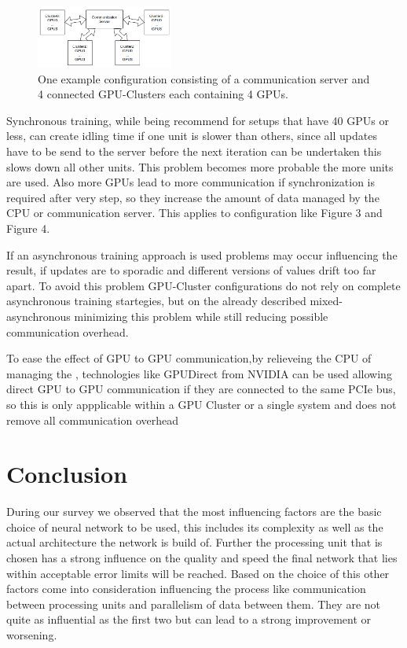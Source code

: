 \documentclass[conference]{IEEEtran}
\begin{document}
\begin{figure}
\centering
\includegraphics[width=0.4\textwidth]{cluster_setup.png}
\caption{One example configuration consisting of a communication server and 4 connected GPU-Clusters each containing 4 GPUs.}
\end{figure}
Synchronous training, while being recommend for setups that have 40 GPUs or less, can create idling time if one unit is slower than others, since all updates have to be send to the server before the next iteration can be undertaken this slows down all other units. This problem becomes more probable the more units are used. Also more GPUs lead to more communication if synchronization is required after very step, so they increase the amount of data managed by the CPU or communication server. This applies to configuration like Figure 3 and Figure 4.

If an asynchronous training approach is used problems may occur influencing the result, if updates are to sporadic and different versions of values drift too far apart. To avoid this problem GPU-Cluster configurations do not rely on complete asynchronous training startegies, but on the already described mixed-asynchronous minimizing this problem while still reducing possible communication overhead.

To ease the effect of GPU to GPU communication,by relieveing the CPU of managing the , technologies like GPUDirect from NVIDIA\cite{nvidiagpudirect2017} can be used allowing direct GPU to GPU communication if they are connected to the same PCIe bus, so this is only appplicable within a GPU Cluster or a single system and does not remove all communication overhead




\section{Conclusion}
During our survey we observed that the most influencing factors are the basic choice of neural network to be used, this includes its complexity as well as the actual architecture the network is build of. Further the processing unit that is chosen has a strong influence on the quality and speed the final network that lies within acceptable error limits will be reached. Based on the choice of this other factors come into consideration influencing the process like communication between processing units and parallelism of data between them. They are not quite as influential as the first two but can lead to a strong improvement or worsening.
\end{document}
